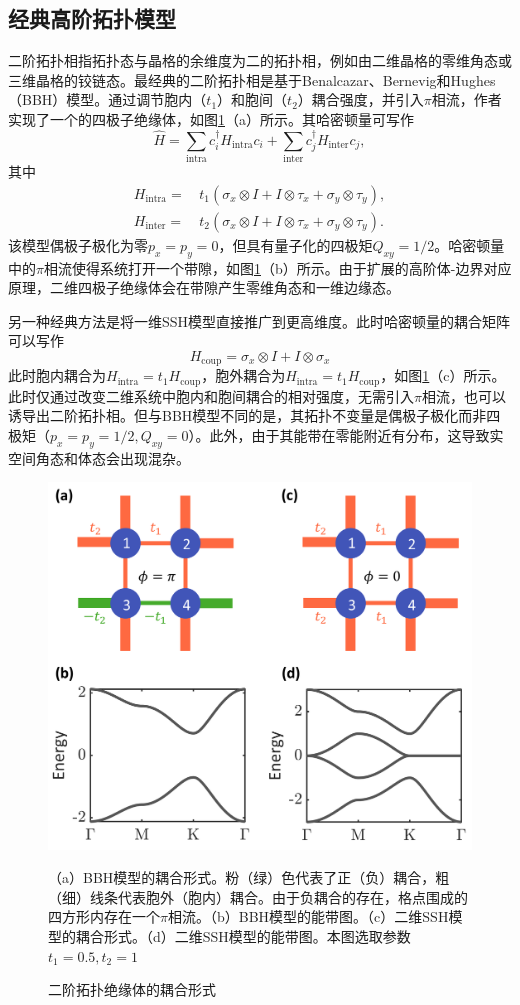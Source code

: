 \subsection{经典高阶拓扑模型}
二阶拓扑相指拓扑态与晶格的余维度为二的拓扑相，例如由二维晶格的零维角态或三维晶格的铰链态。最经典的二阶拓扑相是基于Benalcazar、Bernevig和Hughes（BBH）模型\cite{benalcazar2017quantized}。通过调节胞内（$t_1$）和胞间（$t_2$）耦合强度，并引入$\pi$相流，作者实现了一个的四极子绝缘体，如图\ref{fig:HOTIBand}（a）所示。其哈密顿量可写作
\begin{equation}
\hat{H} = \sum_\text{intra} c_i^\dagger H_\text{intra} c_i + \sum_\text{inter} c_j^\dagger H_\text{inter} c_j,
\end{equation}
其中
\begin{equation}
\begin{aligned}
H_\text{intra} = & \, t_1 (\sigma_x \otimes I + I \otimes \tau_x + \sigma_y \otimes \tau_y), \\
H_\text{inter} = & \, t_2 (\sigma_x \otimes I + I \otimes \tau_x + \sigma_y \otimes \tau_y).
\end{aligned}
\end{equation}
该模型偶极子极化为零$p_x=p_y=0$，但具有量子化的四极矩$Q_{xy}=1/2$。哈密顿量中的$\pi$相流使得系统打开一个带隙，如图\ref{fig:HOTIBand}（b）所示。由于扩展的高阶体-边界对应原理，二维四极子绝缘体会在带隙产生零维角态和一维边缘态。

另一种经典方法是将一维SSH模型直接推广到更高维度\cite{noh2018topological,ni2019observation,zhang2019second,xue2019acoustic,zhang2020low}。此时哈密顿量的耦合矩阵可以写作
\begin{equation}
H_{\text{coup}} = \sigma_x \otimes I + I \otimes \sigma_x
\end{equation}
此时胞内耦合为$H_\text{intra}=t_1H_{\text{coup}}$，胞外耦合为$H_\text{intra}=t_1H_{\text{coup}}$，如图\ref{fig:HOTIBand}（c）所示。此时仅通过改变二维系统中胞内和胞间耦合的相对强度，无需引入$\pi$相流，也可以诱导出二阶拓扑相。但与BBH模型不同的是，其拓扑不变量是偶极子极化而非四极矩（$p_x=p_y=1/2, Q_{xy}=0$）。此外，由于其能带在零能附近有分布，这导致实空间角态和体态会出现混杂。

\begin{figure}[htbp]
    \centering
    \includegraphics[width=0.5\linewidth]{figure/Introduction/HOTIBand.png}
    \caption{二阶拓扑绝缘体的耦合形式}
    \label{fig:HOTIBand}
    （a）BBH模型的耦合形式。粉（绿）色代表了正（负）耦合，粗（细）线条代表胞外（胞内）耦合。由于负耦合的存在，格点围成的四方形内存在一个$\pi$相流。（b）BBH模型的能带图。（c）二维SSH模型的耦合形式。（d）二维SSH模型的能带图。本图选取参数$t_1=0.5, t_2=1$
\end{figure}

